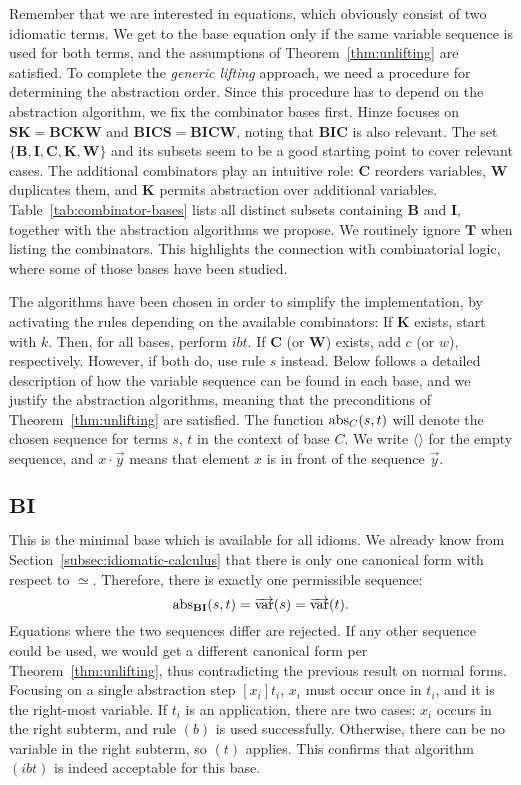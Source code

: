 Remember that we are interested in equations, which obviously consist of two
idiomatic terms.
We get to the base equation only if the same variable sequence is used for both
terms, and the assumptions of Theorem~\ref{thm:unlifting} are satisfied.
To complete the \emph{generic lifting} approach, we need a procedure for
determining the abstraction order.
Since this procedure has to depend on the abstraction algorithm, we fix the
combinator bases first.
Hinze focuses on $\mathbf{SK = BCKW}$ and $\mathbf{BICS = BICW}$, noting
that $\mathbf{BIC}$ is also relevant.
The set $\{\mathbf{B,I,C,K,W}\}$ and its subsets seem to be a good starting
point to cover relevant cases.
The additional combinators play an intuitive role:
$\mathbf{C}$ reorders variables, $\mathbf{W}$ duplicates them, and $\mathbf{K}$
permits abstraction over additional variables.
Table~\ref{tab:combinator-bases} lists all distinct subsets containing
$\mathbf{B}$ and $\mathbf{I}$, together with the abstraction algorithms we
propose.
We routinely ignore $\mathbf{T}$ when listing the combinators.
This highlights the connection with combinatorial logic, where some of those
bases have been studied.

The algorithms have been chosen in order to simplify the implementation, by
activating the rules depending on the available combinators:
If $\mathbf{K}$ exists, start with $k$.
Then, for all bases, perform $ibt$.
If $\mathbf{C}$ (or $\mathbf{W}$) exists, add $c$ (or $w$), respectively.
However, if both do, use rule $s$ instead.
Below follows a detailed description of how the variable sequence can be found
in each base, and we justify the abstraction algorithms, meaning that the
preconditions of Theorem~\ref{thm:unlifting} are satisfied.
The function $\operatorname{abs}_C(s,t)$ will denote the chosen sequence for terms $s$, $t$
in the context of base $C$.
We write $\langle\rangle$ for the empty sequence, and $x \cdot \vec y$ means
that element $x$ is in front of the sequence $\vec y$.

\subsection*{$\mathbf{BI}$}\label{subsec:base-bi}

This is the minimal base which is available for all idioms.
We already know from Section~\ref{subsec:idiomatic-calculus} that there is only
one canonical form with respect to $\simeq$.
Therefore, there is exactly one permissible sequence:
\[ \operatorname{abs}_\mathbf{BI}(s,t) = \overrightarrow{\operatorname{var}}(s) = \overrightarrow{\operatorname{var}}(t). \]
Equations where the two sequences differ are rejected.
If any other sequence could be used, we would get a different canonical form
per Theorem~\ref{thm:unlifting}, thus contradicting the previous result on
normal forms.
Focusing on a single abstraction step $[x_i]t_i$, $x_i$ must occur once in
$t_i$, and it is the right-most variable.
If $t_i$ is an application, there are two cases:
$x_i$ occurs in the right subterm, and rule $(b)$ is used successfully.
Otherwise, there can be no variable in the right subterm, so $(t)$ applies.
This confirms that algorithm $(ibt)$ is indeed acceptable for this base.

